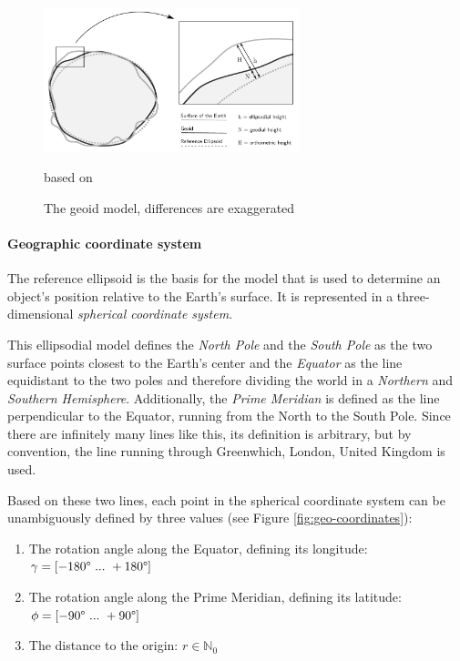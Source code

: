\begin{figure}[H]
  \centering
  \includegraphics[width=0.66\textwidth]{graphics/basics/geoid}
  \caption{The geoid model, differences are exaggerated}
  \small{based on \cite[Fig. 3-6, p. 75]{bolstad2008gis}}
  \label{fig:geoid}
\end{figure}


\paragraph{Geographic coordinate system} %
\label{ssub:geographic_coordinate_system}

The reference ellipsoid is the basis for the model that is used to determine an object's position relative to the Earth's surface. It is represented in a three-dimensional \emph{spherical coordinate system}.

This ellipsodial model defines the \emph{North Pole} and the \emph{South Pole} as the two surface points closest to the Earth's center and the \emph{Equator} as the line equidistant to the two poles and therefore dividing the world in a \emph{Northern} and \emph{Southern Hemisphere}. Additionally, the \emph{Prime Meridian} is defined as the line perpendicular to the Equator, running from the North to the South Pole. Since there are infinitely many lines like this, its definition is arbitrary, but by convention, the line running through Greenwhich, London, United Kingdom is used.

Based on these two lines, each point in the spherical coordinate system can be unambiguously defined by three values
(see Figure \ref{fig:geo-coordinates}):

\begin{enumerate}
  \item The rotation angle along the Equator, defining its longitude: $\gamma = [-180\degree ~...~ +180\degree]$
  \item The rotation angle along the Prime Meridian, defining its latitude: $\phi = [-90\degree ~...~ +90\degree]$
  \item The distance to the origin: $r \in \mathbb{N}_0$
\end{enumerate}

